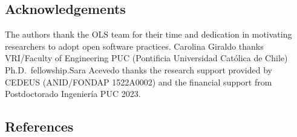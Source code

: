 \documentclass[
]{article}
\begin{document}
\hypertarget{acknowledgements}{%
\subsection{Acknowledgements}\label{acknowledgements}}

The authors thank the OLS team for their time and dedication in
motivating researchers to adopt open software practices. Carolina
Giraldo thanks VRI/Faculty of Engineering PUC (Pontificia Universidad
Católica de Chile) Ph.D.~fellowship.Sara Acevedo thanks the research
support provided by CEDEUS (ANID/FONDAP 1522A0002) and the financial
support from Postdoctorado Ingeniería PUC 2023.

\hypertarget{references}{%
\subsection*{References}\label{references}}
\end{document}
